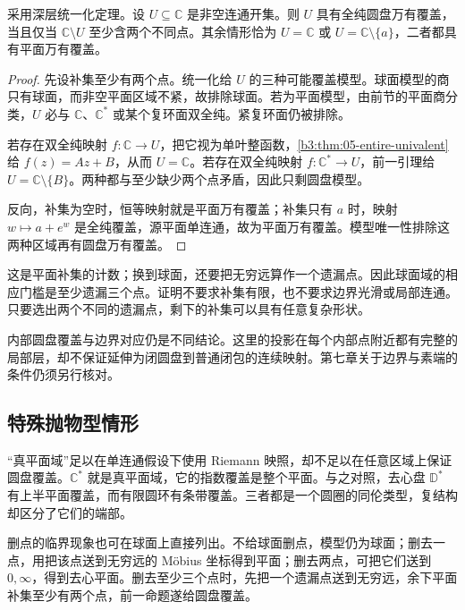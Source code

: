 \begin{proposition}[平面区域的圆盘覆盖]\label{b3:prop:12-planar-hyperbolic}
采用深层统一化定理。设 \(U\subseteq\mathbb C\) 是非空连通开集。则 \(U\) 具有全纯圆盘万有覆盖，当且仅当 \(\mathbb C\setminus U\) 至少含两个不同点。其余情形恰为 \(U=\mathbb C\) 或 \(U=\mathbb C\setminus\{a\}\)，二者都具有平面万有覆盖。
\end{proposition}
\begin{proof}
先设补集至少有两个点。统一化给 \(U\) 的三种可能覆盖模型。球面模型的商只有球面，而非空平面区域不紧，故排除球面。若为平面模型，由前节的平面商分类，\(U\) 必与 \(\mathbb C\)、\(\mathbb C^*\) 或某个复环面双全纯。紧复环面仍被排除。

若存在双全纯映射 \(f:\mathbb C\to U\)，把它视为单叶整函数，\cref{b3:thm:05-entire-univalent}给 \(f(z)=Az+B\)，从而 \(U=\mathbb C\)。若存在双全纯映射 \(f:\mathbb C^*\to U\)，前一引理给 \(U=\mathbb C\setminus\{B\}\)。两种都与至少缺少两个点矛盾，因此只剩圆盘模型。

反向，补集为空时，恒等映射就是平面万有覆盖；补集只有 \(a\) 时，映射 \(w\mapsto a+e^w\) 是全纯覆盖，源平面单连通，故为平面万有覆盖。模型唯一性排除这两种区域再有圆盘万有覆盖。
\end{proof}
这是平面补集的计数；换到球面，还要把无穷远算作一个遗漏点。因此球面域的相应门槛是至少遗漏三个点。证明不要求补集有限，也不要求边界光滑或局部连通。只要选出两个不同的遗漏点，剩下的补集可以具有任意复杂形状。

\ProseParagraphBreak
内部圆盘覆盖与边界对应仍是不同结论。这里的投影在每个内部点附近都有完整的局部层，却不保证延伸为闭圆盘到普通闭包的连续映射。第七章关于边界与素端的条件仍须另行核对。

\subsection{特殊抛物型情形}
\label{b3:subsec:120402}

“真平面域”足以在单连通假设下使用 Riemann 映照，却不足以在任意区域上保证圆盘覆盖。\(\mathbb C^*\) 就是真平面域，它的指数覆盖是整个平面。与之对照，去心盘 \(\mathbb D^*\) 有上半平面覆盖，而有限圆环有条带覆盖。三者都是一个圆圈的同伦类型，复结构却区分了它们的端部。

\ProseParagraphBreak
删点的临界现象也可在球面上直接列出。不给球面删点，模型仍为球面；删去一点，用把该点送到无穷远的 Möbius 坐标得到平面；删去两点，可把它们送到 \(0,\infty\)，得到去心平面。删去至少三个点时，先把一个遗漏点送到无穷远，余下平面补集至少有两个点，前一命题遂给圆盘覆盖。

